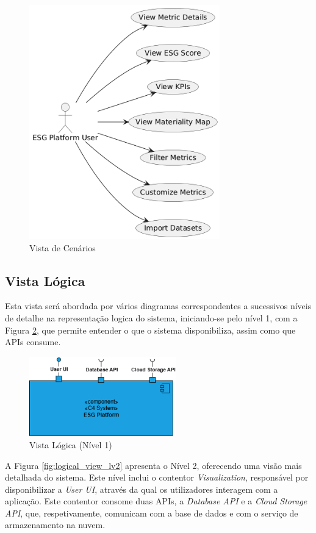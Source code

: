 \begin{figure}[H]
    \centering
    \includegraphics[height=4in,keepaspectratio]{frontmatter/assets/diagrams/Scenario View/Scenario_View.png}
    \caption{Vista de Cenários}
    \label{fig:scenario_view}
\end{figure}

\subsection{Vista Lógica}

Esta vista será abordada por vários diagramas correspondentes a sucessivos níveis de detalhe na representação logica do sistema, iniciando-se pelo nível 1, com a Figura \ref{fig:logical_view_lv1}, que permite entender o que o sistema disponibiliza, assim como que APIs consume.

\begin{figure}[H]
    \centering
    \includegraphics[width=2.5in,keepaspectratio]{frontmatter/assets/diagrams/Logical View/Logical View Lv1.drawio.png}
    \caption{Vista Lógica (Nível 1)}
    \label{fig:logical_view_lv1}
\end{figure}

A Figura \ref{fig:logical_view_lv2} apresenta o Nível 2, oferecendo uma visão mais detalhada do sistema. Este nível inclui o contentor \textit{Visualization}, responsável por disponibilizar a \textit{User UI}, através da qual os utilizadores interagem com a aplicação. Este contentor consome duas APIs, a \textit{Database API} e a \textit{Cloud Storage API}, que, respetivamente, comunicam com a base de dados e com o serviço de armazenamento na nuvem.

